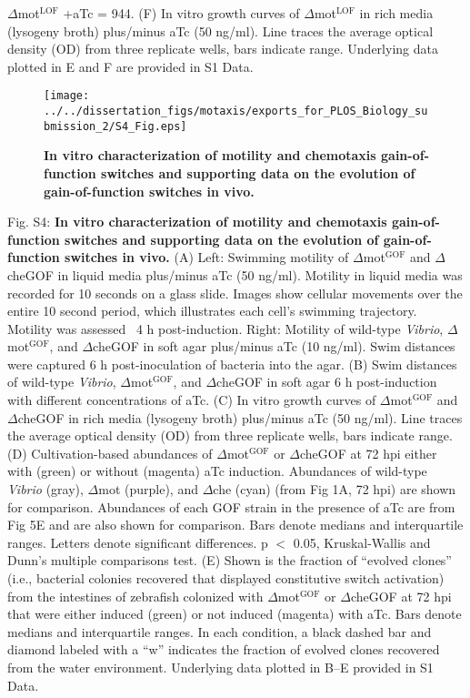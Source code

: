 $\Delta$mot$^{\text{LOF}}$ +aTc = 944. (F) In vitro growth curves of $\Delta$mot$^{\text{LOF}}$ in rich media (lysogeny broth) plus/minus aTc (50 ng/ml). Line traces the average optical density (OD) from three replicate wells, bars indicate range. Underlying data plotted in E and F are provided in S1 Data.

\newpage
\begin{figure}[h!]
	\centerline{
		\texttt{[image: ../../dissertation\_figs/motaxis/exports\_for\_PLOS\_Biology\_submission\_2/S4\_Fig.eps]}}
	\caption{\textbf{In vitro characterization of motility and chemotaxis gain-of-function switches and supporting data on the evolution of gain-of-function switches in vivo.}}
\end{figure}

Fig. S4: \textbf{In vitro characterization of motility and chemotaxis gain-of-function switches and supporting data on the evolution of gain-of-function switches in vivo.} (A) Left: Swimming motility of $\Delta$mot$^{\text{GOF}}$ and $\Delta$cheGOF in liquid media plus/minus aTc (50 ng/ml). Motility in liquid media was recorded for 10 seconds on a glass slide. Images show cellular movements over the entire 10 second period, which illustrates each cell's swimming trajectory. Motility was assessed ~4 h post-induction. Right: Motility of wild-type \textit{Vibrio}, $\Delta$mot$^{\text{GOF}}$, and $\Delta$cheGOF in soft agar plus/minus aTc (10 ng/ml). Swim distances were captured 6 h post-inoculation of bacteria into the agar. (B) Swim distances of wild-type \textit{Vibrio}, $\Delta$mot$^{\text{GOF}}$, and $\Delta$cheGOF in soft agar 6 h post-induction with different concentrations of aTc. (C) In vitro growth curves of $\Delta$mot$^{\text{GOF}}$ and $\Delta$cheGOF in rich media (lysogeny broth) plus/minus aTc (50 ng/ml). Line traces the average optical density (OD) from three replicate wells, bars indicate range. (D) Cultivation-based abundances of $\Delta$mot$^{\text{GOF}}$ or $\Delta$cheGOF at 72 hpi either with (green) or without (magenta) aTc induction. Abundances of wild-type \textit{Vibrio} (gray), $\Delta$mot (purple), and $\Delta$che (cyan) (from Fig 1A, 72 hpi) are shown for comparison. Abundances of each GOF strain in the presence of aTc are from Fig 5E and are also shown for comparison. Bars denote medians and interquartile ranges. Letters denote significant differences. p $ < $ 0.05, Kruskal-Wallis and Dunn's multiple comparisons test. (E) Shown is the fraction of ``evolved clones'' (i.e., bacterial colonies recovered that displayed constitutive switch activation) from the intestines of zebrafish colonized with $\Delta$mot$^{\text{GOF}}$ or $\Delta$cheGOF at 72 hpi that were either induced (green) or not induced (magenta) with aTc. Bars denote medians and interquartile ranges. In each condition, a black dashed bar and diamond labeled with a ``w'' indicates the fraction of evolved clones recovered from the water environment. Underlying data plotted in B–E provided in S1 Data.

